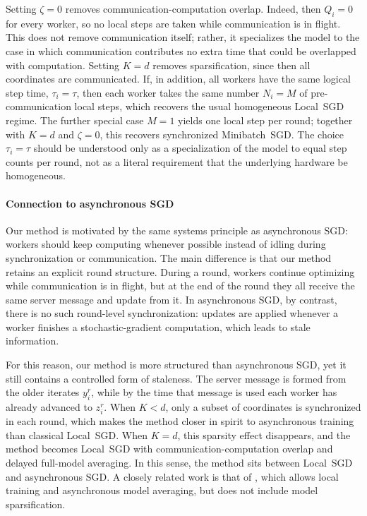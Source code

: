 \documentclass{article}
\theoremstyle{plain}
\theoremstyle{definition}
\newcommand{\algname}[1]{{\color{alggray}\small\sf#1}\xspace}
\newcommand{\minibatch}{\algname{Minibatch~SGD}}
\newcommand{\sgd}{\algname{SGD}}
\newcommand{\localsgd}{\algname{Local~SGD}}
\begin{document}
Setting \(\zeta=0\) removes communication-computation overlap.
Indeed, then \(Q_i=0\) for every worker, so no local steps are taken while communication is in flight.
This does not remove communication itself; rather, it specializes the model to the case in which communication contributes no extra time that could be overlapped with computation.
Setting \(K=d\) removes sparsification, since then all coordinates are communicated.
If, in addition, all workers have the same logical step time, \(\tau_i=\tau\), then each worker takes the same number \(N_i=M\) of pre-communication local steps, which recovers the usual homogeneous \localsgd regime.
The further special case \(M=1\) yields one local step per round; together with \(K=d\) and \(\zeta=0\), this recovers synchronized \minibatch.
The choice \(\tau_i=\tau\) should be understood only as a specialization of the model to equal step counts per round, not as a literal requirement that the underlying hardware be homogeneous.

\paragraph{Connection to asynchronous SGD}
% 
Our method is motivated by the same systems principle as asynchronous \sgd \citep{agarwal2011distributed, maranjyan2025thesis}:
workers should keep computing whenever possible instead of idling during synchronization or communication.
The main difference is that our method retains an explicit round structure.
During a round, workers continue optimizing while communication is in flight, but at the end of the round they all receive the same server message and update from it.
In asynchronous \sgd, by contrast, there is no such round-level synchronization:
updates are applied whenever a worker finishes a stochastic-gradient computation, which leads to stale information.

For this reason, our method is more structured than asynchronous \sgd, yet it still contains a controlled form of staleness.
The server message is formed from the older iterates \(y_i^r\), while by the time that message is used each worker has already advanced to \(z_i^r\).
When \(K<d\), only a subset of coordinates is synchronized in each round, which makes the method closer in spirit to asynchronous training than classical \localsgd.
When \(K=d\), this sparsity effect disappears, and the method becomes \localsgd with communication-computation overlap and delayed full-model averaging.
In this sense, the method sits between \localsgd and asynchronous \sgd.
A closely related work is that of \citet{tyurin2026birch}, which allows local training and asynchronous model averaging, but does not include model sparsification.
% 
% 
\end{document}
